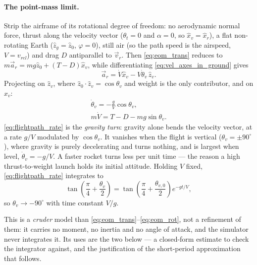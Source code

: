 \paragraph{The point-mass limit.} Strip the airframe of its rotational degree of freedom: no
aerodynamic normal force, thrust along the velocity vector ($\theta_t=0$ and $\alpha=0$, so
$\hat{x}_v=\hat{x}_r$), a flat non-rotating Earth ($\hat{z}_g=\hat{z}_0$, $\varphi=0$), still air
(so the path speed is the airspeed, $V=v_{rel}$) and drag $D$
antiparallel to $\vec{v}_r$. Then \autoref{eq:eom_trans} reduces to
$m\vec{a}_r = mg\hat{z}_0 + (T-D)\hat{x}_v$, while differentiating
\autoref{eq:vel_axes_in_ground} gives
\begin{equation}\label{eq:accel_in_vel_axes}
    \vec{a}_r = \dot{V}\hat{x}_v - V\dot\theta_v\,\hat{z}_v .
\end{equation}
Projecting on $\hat{z}_v$, where $\hat{z}_0\cdot\hat{z}_v=\cos\theta_v$ and weight is the only
contributor, and on $\hat{x}_v$:
\begin{gather}
    \dot\theta_v = -\frac{g}{V}\cos\theta_v, \label{eq:flightpath_rate}\\
    m\dot{V} = T - D - mg\sin\theta_v. \label{eq:speed_rate}
\end{gather}
\autoref{eq:flightpath_rate} is the \emph{gravity turn}: gravity alone bends the velocity vector, at
a rate $g/V$ modulated by $\cos\theta_v$. It vanishes when the flight is vertical
($\theta_v=\pm90^\circ$), where gravity is purely decelerating and turns nothing, and is largest
when level, $\dot\theta_v=-g/V$. A faster rocket turns less per unit time --- the reason a high
thrust-to-weight launch holds its initial attitude. Holding $V$ fixed, \autoref{eq:flightpath_rate}
integrates to
\begin{equation}\label{eq:gravity_turn_closed}
    \tan\!\left(\frac{\pi}{4}+\frac{\theta_v}{2}\right)
        = \tan\!\left(\frac{\pi}{4}+\frac{\theta_{v,0}}{2}\right) e^{-gt/V},
\end{equation}
so $\theta_v\to-90^\circ$ with time constant $V/g$.

This is a \emph{cruder} model than \autoref{eq:eom_trans}--\autoref{eq:eom_rot}, not a refinement of
them: it carries no moment, no inertia and no angle of attack, and the simulator never integrates it.
Its uses are the two below --- a closed-form estimate to check the integrator against, and the
justification of the short-period approximation that follows.

